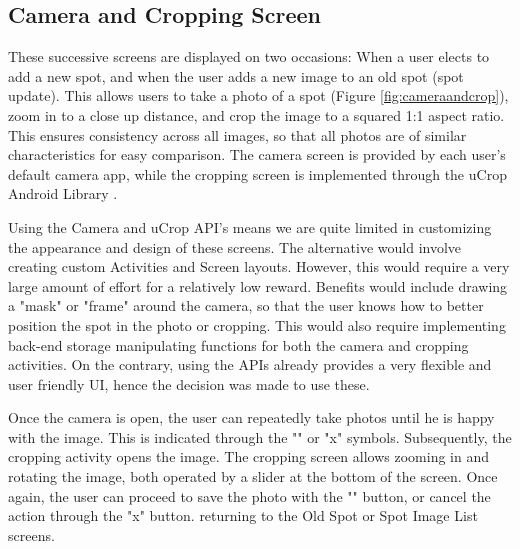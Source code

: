 \subsection{Camera and Cropping Screen}
These successive screens are displayed on two occasions: When a user elects to add a new spot, and when the user adds a new image to an old spot (spot update). This allows users to take a photo of a spot (Figure \ref{fig:cameraandcrop}), zoom in to a close up distance, and crop the image to a squared 1:1 aspect ratio. This ensures consistency across all images, so that all photos are of similar characteristics for easy comparison. The camera screen is provided by each user's default camera app, while the cropping screen is implemented through the uCrop Android Library \cite{yalantis_2019}. 

Using the Camera and uCrop API's means we are quite limited in customizing the appearance and design of these screens. The alternative would involve creating custom Activities and Screen layouts. However, this would require a very large amount of effort for a relatively low reward. Benefits would include drawing a "mask" or "frame" around the camera, so that the user knows how to better position the spot in the photo or cropping. This would also require implementing back-end storage manipulating functions for both the camera and cropping activities. On the contrary, using the APIs already provides a very flexible and user friendly UI, hence the decision was made to use these. 

Once the camera is open, the user can repeatedly take photos until he is happy with the image. This is indicated through the "\checkmark" or "x" symbols. Subsequently, the cropping activity opens the image. The cropping screen allows zooming in and rotating the image, both operated by a slider at the bottom of the screen. Once again, the user can proceed to save the photo with the "\checkmark" button, or cancel the action through the "x" button. returning to the Old Spot or Spot Image List screens.

